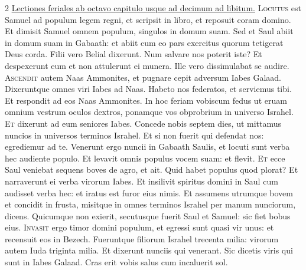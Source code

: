 \begin{multicols*}{2}
\newline \ul{Lectiones feriales ab octavo capitulo usque ad decimum ad libitum.}
{\color{Red} }
\lettrine[lines=2]{\zallmancaps \color{Blue} L}{ocutus} est Samuel ad populum legem regni, et scripsit in libro, et reposuit coram domino. Et dimisit Samuel omnem populum, singulos in domum suam. Sed et Saul abiit in domum suam in Gabaath: et abiit cum eo pars exercitus quorum tetigerat Deus corda. Filii vero Belial dixerunt. Num salvare nos poterit iste? Et despexerunt eum et non attulerunt ei munera. Ille vero dissimulabat se audire.%
\lettrine[lines=2]{\zallmancaps \color{Red} A}{scendit} autem Naas Ammonites, et pugnare cepit adversum Iabes Galaad. Dixeruntque omnes viri Iabes ad Naas. Habeto nos federatos, et serviemus tibi. Et respondit ad eos Naas Ammonites. In hoc feriam vobiscum fedus ut eruam omnium vestrum oculos dextros, ponamque vos obprobrium in universo Israhel.
\lettrine[lines=2]{\zallmancaps \color{Blue} E}{t} dixerunt ad eum seniores Iabes. Concede nobis septem dies, ut mittamus nuncios in universos terminos Israhel. Et si non fuerit qui defendat nos: egrediemur ad te. Venerunt ergo nuncii in Gabaath Saulis, et locuti sunt verba hec audiente populo. Et levavit omnis populus vocem suam: et flevit.
\lettrine[lines=2]{\zallmancaps \color{Red} E}{t} ecce Saul veniebat sequens boves de agro, et ait. Quid habet populus quod plorat? Et narraverunt ei verba virorum Iabes. Et insilivit spiritus domini in Saul cum audisset verba hec: et iratus est furor eius nimis. Et assumens utrumque bovem et concidit in frusta, misitque in omnes terminos Israhel per manum nunciorum, dicens. Quicumque non exierit, secutusque fuerit Saul et Samuel: sic fiet bobus eius.
\lettrine[lines=2]{\zallmancaps \color{Blue} I}{nvasit} ergo timor domini populum, et egressi sunt quasi vir unus: et recensuit eos in Bezech. Fueruntque filiorum Israhel trecenta milia: virorum autem Iuda triginta milia. Et dixerunt nunciis qui venerant. Sic dicetis viris qui sunt in Iabes Galaad. Cras erit vobis salus cum incaluerit sol.

\end{multicols*}
